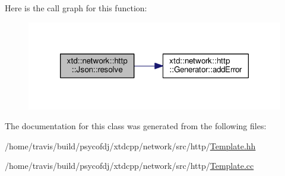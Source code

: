 Here is the call graph for this function\-:
\nopagebreak
\begin{figure}[H]
\begin{center}
\leavevmode
\includegraphics[width=318pt]{classxtd_1_1network_1_1http_1_1Json_a7a9ed4f957c77813ecbb84e228936b5e_cgraph}
\end{center}
\end{figure}




The documentation for this class was generated from the following files\-:\begin{DoxyCompactItemize}
\item 
/home/travis/build/psycofdj/xtdcpp/network/src/http/\hyperlink{Template_8hh}{Template.\-hh}\item 
/home/travis/build/psycofdj/xtdcpp/network/src/http/\hyperlink{Template_8cc}{Template.\-cc}\end{DoxyCompactItemize}
